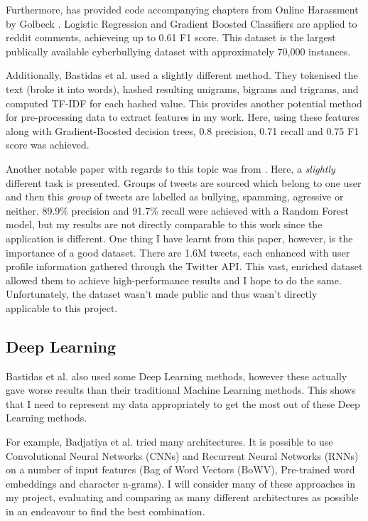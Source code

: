 \documentclass[12pt,a4paper]{article}
\begin{document}
Furthermore, \cite{Dixon} has provided code accompanying chapters from Online Harassment by Golbeck \citeyear{Golbeck}. Logistic Regression and Gradient Boosted Classifiers are applied to reddit comments, achieveing up to 0.61 F1 score. This dataset is the largest publically available cyberbullying dataset with approximately 70,000 instances. 

Additionally, Bastidas et al. \citeyear[p.2/3]{Hack} used a slightly different method. They tokenised the text (broke it into words), hashed resulting unigrams, bigrams and trigrams, and computed TF-IDF for each hashed value. This provides another potential method for pre-processing data to extract features in my work. Here, using these features along with Gradient-Boosted decision trees, 0.8 precision, 0.71 recall and 0.75 F1 score was achieved. 

Another notable paper with regards to this topic was from \cite{Birds}. Here, a \textit{slightly} different task is presented. Groups of tweets are sourced which belong to one user and then this \textit{group} of tweets are labelled as bullying, spamming, agressive or neither. 89.9\% precision and 91.7\% recall were achieved with a Random Forest model, but my results are not directly comparable to this work since the application is different. One thing I have learnt from this paper, however, is the importance of a good dataset. There are 1.6M tweets, each enhanced with user profile information gathered through the Twitter API. This vast, enriched dataset allowed them to achieve high-performance results and I hope to do the same. Unfortunately, the dataset wasn't made public and thus wasn't directly applicable to this project.

\subsection{Deep Learning}
Bastidas et al. \citeyear[p.3]{Hack} also used some Deep Learning methods, however these actually gave worse results than their traditional Machine Learning methods. This shows that I need to represent my data appropriately to get the most out of these Deep Learning methods.

For example, Badjatiya et al. \cite{Badjatiya} tried many architectures. It is possible to use Convolutional Neural Networks (CNNs) and Recurrent Neural Networks (RNNs) on a number of input features (Bag of Word Vectors (BoWV), Pre-trained word embeddings and character n-grams). I will consider many of these approaches in my project, evaluating and comparing as many different architectures as possible in an endeavour to find the best combination.
\end{document}
